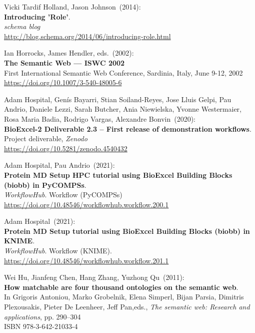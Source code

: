 \begin{thebibliography}{9}
Vicki Tardif Holland, Jason Johnson~(2014): \\
\textbf{Introducing '{Role}'}.\\
\emph{schema blog}\\
\url{http://blog.schema.org/2014/06/introducing-role.html}

Ian Horrocks, James Hendler, eds.~(2002): \\
\textbf{The {Semantic Web} --- {ISWC} 2002} \\
First International Semantic Web Conference, Sardinia, Italy, June 9-12, 2002\\
\url{https://doi.org/10.1007/3-540-48005-6}

Adam Hospital, Genís Bayarri, Stian Soiland-Reyes, Jose Lluis Gelpi, Pau Andrio, Daniele Lezzi, Sarah Butcher, Ania Niewielska, Yvonne Westermaier, Rosa Maria Badia, Rodrigo Vargas, Alexandre Bonvin~(2020): \\
\textbf{BioExcel-2 Deliverable 2.3 -- First release of demonstration workflows}.\\
Project deliverable, \emph{Zenodo}\\
\url{https://doi.org/10.5281/zenodo.4540432}

Adam Hospital, Pau Andrio~(2021): \\
\textbf{Protein MD Setup HPC tutorial using BioExcel Building Blocks (biobb) in PyCOMPSs}.\\
\emph{WorkflowHub}. Workflow (PyCOMPSs)\\
\url{https://doi.org/10.48546/workflowhub.workflow.200.1}

Adam Hospital~(2021): \\
\textbf{Protein MD Setup tutorial using BioExcel Building Blocks (biobb) in KNIME}.\\
\emph{WorkflowHub}. Workflow (KNIME).\\
\url{https://doi.org/10.48546/workflowhub.workflow.201.1}

Wei Hu, Jianfeng Chen, Hang Zhang, Yuzhong Qu~(2011): \\
\textbf{How matchable are four thousand ontologies on the semantic web}. \\
In Grigoris
Antoniou, Marko Grobelnik, Elena Simperl, Bijan Parsia, Dimitris
Plexousakis, Pieter De Leenheer, Jeff Pan,eds., \emph{The semantic web: {Research} and applications}, pp. 290--304 \\
ISBN 978-3-642-21033-4


\end{thebibliography}
